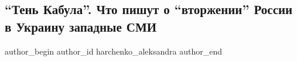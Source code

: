  
 
 
 
 
 
\subsection{\enquote{Тень Кабула}. Что пишут о \enquote{вторжении} России в Украину западные СМИ}
\label{sec:13_02_2022.stz.news.ua.strana.3.tenj_kabula}
 
\ifcmt
 author_begin
   author_id harchenko_aleksandra
 author_end
\fi

